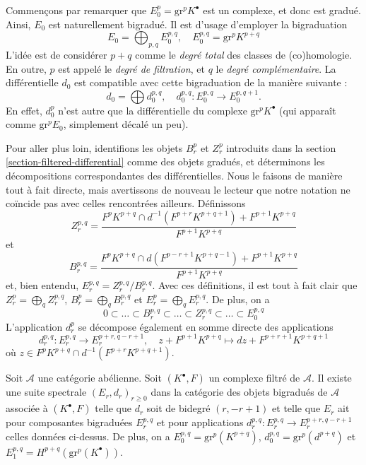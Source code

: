 \medskip\noindent
Commençons par remarquer que $E_0^p = \text{gr}^p K^\bullet$ est un
complexe, et donc est gradué. Ainsi, $E_0$ est naturellement bigradué.
Il est d'usage d'employer la bigraduation
$$
E_0 = \bigoplus\nolimits_{p, q} E_0^{p, q},
\quad
E_0^{p, q} = \text{gr}^p K^{p + q}
$$
L'idée est de considérer $p + q$ comme le {\it degré total} des
classes de (co)homologie. En outre, $p$ est appelé le {\it degré de filtration},
et $q$ le {\it degré complémentaire}.
La différentielle $d_0$ est compatible avec cette
bigraduation de la manière suivante :
$$
d_0  = \bigoplus d_0^{p, q},
\quad
d_0^{p, q} : E_0^{p, q} \to E_0^{p, q + 1}.
$$
En effet, $d_0^p$ n'est autre que la différentielle du complexe
$\text{gr}^p K^\bullet$ (qui apparaît comme $\text{gr}^pE_0$, simplement décalé
un peu).

\medskip\noindent
Pour aller plus loin, identifions les objets $B_r^p$ et $Z_r^p$ introduits
dans la section \ref{section-filtered-differential} comme des objets gradués,
et déterminons les décompositions correspondantes des différentielles.
Nous le faisons de manière tout à fait directe, mais avertissons de nouveau
le lecteur que notre notation ne coïncide pas avec celles rencontrées
ailleurs. Définissons
$$
Z_r^{p, q} =
\frac{F^pK^{p + q} \cap d^{-1}(F^{p + r}K^{p + q + 1}) + F^{p + 1}K^{p + q}}
{F^{p + 1}K^{p + q}}
$$
et
$$
B_r^{p, q} =
\frac{F^pK^{p + q} \cap d(F^{p - r + 1}K^{p + q - 1}) + F^{p + 1}K^{p + q}}
{F^{p + 1}K^{p + q}}
$$
et, bien entendu, $E_r^{p, q} = Z_r^{p, q}/B_r^{p, q}$.
Avec ces définitions, il est tout à fait clair que
$Z_r^p = \bigoplus_q Z_r^{p, q}$,
$B_r^p = \bigoplus_q B_r^{p, q}$ et
$E_r^p = \bigoplus_q E_r^{p, q}$. De plus, on a
$$
0 \subset \ldots \subset B_r^{p, q} \subset
\ldots
\subset Z_r^{p, q} \subset \ldots \subset E_0^{p, q}
$$
L'application $d_r^p$ se décompose également en somme directe des applications
$$
d_r^{p, q} : E_r^{p, q} \longrightarrow E_r^{p + r, q - r + 1},
\quad
z + F^{p + 1}K^{p + q}
\mapsto
dz + F^{p + r + 1}K^{p + q + 1}
$$
où $z \in F^pK^{p + q} \cap d^{-1}(F^{p + r}K^{p + q + 1})$.

\begin{lemma}
\label{lemma-spectral-sequence-filtered-complex}
Soit $\mathcal{A}$ une catégorie abélienne. Soit $(K^\bullet, F)$ un
complexe filtré de $\mathcal{A}$. Il existe une suite spectrale
$(E_r, d_r)_{r \geq 0}$ dans la catégorie des objets bigradués de $\mathcal{A}$
associée à $(K^\bullet, F)$ telle que $d_r$ soit de bidegré $(r, - r + 1)$
et telle que $E_r$ ait pour composantes bigraduées $E_r^{p, q}$ et pour applications
$d_r^{p, q} : E_r^{p, q} \to E_r^{p + r, q - r + 1}$ celles données ci-dessus.
De plus, on a $E_0^{p, q} = \text{gr}^p(K^{p + q})$,
$d_0^{p, q} = \text{gr}^p(d^{p + q})$
et $E_1^{p, q} = H^{p + q}(\text{gr}^p(K^\bullet))$.
\end{lemma}

